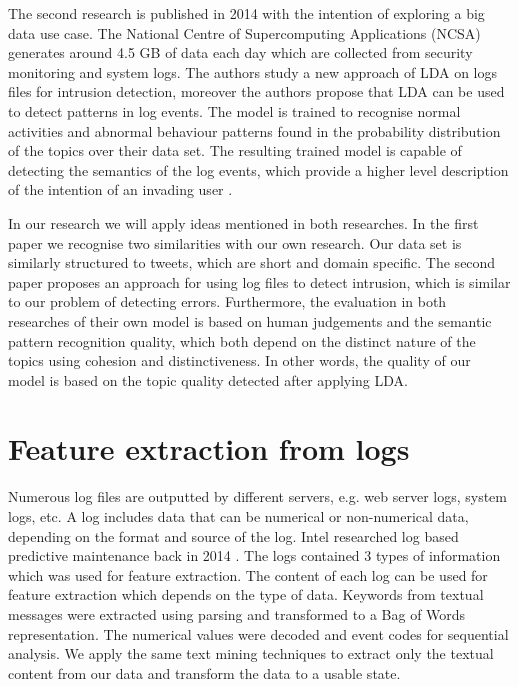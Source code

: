 \newpage
The second research is published in 2014 with the intention of exploring a big data use case. The National Centre of Supercomputing Applications (NCSA) generates around 4.5 GB of data each day which are collected from security monitoring and system logs. The authors study a new approach of LDA on logs files for intrusion detection, moreover the authors propose that LDA can be used to detect patterns in log events. The model is trained to recognise normal activities and abnormal behaviour patterns found in the probability distribution of the topics over their data set. The resulting trained model is capable of detecting the semantics of the log events, which provide a higher level description of the intention of an invading user \cite{Jingwei2014KnowledgeLDA}. 

In our research we will apply ideas mentioned in both researches. In the first paper we recognise two similarities with our own research. Our data set is similarly structured to tweets, which are short and domain specific. The second paper proposes an approach for using log files to detect intrusion, which is similar to our problem of detecting errors. Furthermore, the evaluation in both researches of their own model is based on human judgements and the semantic pattern recognition quality, which both depend on the distinct nature of the topics using cohesion and distinctiveness. In other words, the quality of our model is based on the topic quality detected after applying LDA.

\section{Feature extraction from logs}\label{research:featureextraction}
Numerous log files are outputted by different servers, e.g. web server logs, system logs, etc. A log includes data that can be numerical or non-numerical data, depending on the format and source of the log. Intel researched log based predictive maintenance back in 2014 \cite{Sipos2014Log-basedMaintenance}. The logs contained 3 types of information which was used for feature extraction. 
The content of each log can be used for feature extraction which depends on the type of data.
Keywords from textual messages were extracted using parsing and transformed to a Bag of Words representation. The numerical values were decoded and event codes for sequential analysis. We apply the same text mining techniques to extract only the textual content from our data and transform the data to a usable state.


